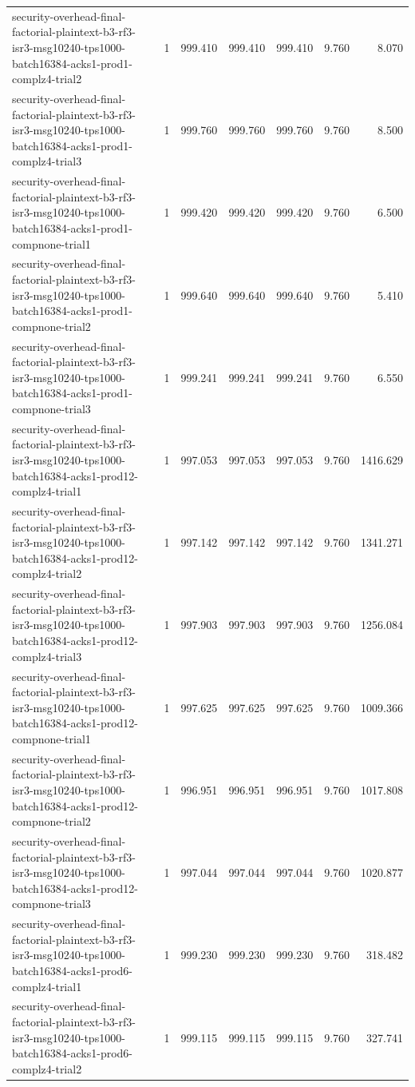 \begin{tabular}{lrrrrrr}
security-overhead-final-factorial-plaintext-b3-rf3-isr3-msg10240-tps1000-batch16384-acks1-prod1-complz4-trial2 & 1 & 999.410 & 999.410 & 999.410 & 9.760 & 8.070 \\
security-overhead-final-factorial-plaintext-b3-rf3-isr3-msg10240-tps1000-batch16384-acks1-prod1-complz4-trial3 & 1 & 999.760 & 999.760 & 999.760 & 9.760 & 8.500 \\
security-overhead-final-factorial-plaintext-b3-rf3-isr3-msg10240-tps1000-batch16384-acks1-prod1-compnone-trial1 & 1 & 999.420 & 999.420 & 999.420 & 9.760 & 6.500 \\
security-overhead-final-factorial-plaintext-b3-rf3-isr3-msg10240-tps1000-batch16384-acks1-prod1-compnone-trial2 & 1 & 999.640 & 999.640 & 999.640 & 9.760 & 5.410 \\
security-overhead-final-factorial-plaintext-b3-rf3-isr3-msg10240-tps1000-batch16384-acks1-prod1-compnone-trial3 & 1 & 999.241 & 999.241 & 999.241 & 9.760 & 6.550 \\
security-overhead-final-factorial-plaintext-b3-rf3-isr3-msg10240-tps1000-batch16384-acks1-prod12-complz4-trial1 & 1 & 997.053 & 997.053 & 997.053 & 9.760 & 1416.629 \\
security-overhead-final-factorial-plaintext-b3-rf3-isr3-msg10240-tps1000-batch16384-acks1-prod12-complz4-trial2 & 1 & 997.142 & 997.142 & 997.142 & 9.760 & 1341.271 \\
security-overhead-final-factorial-plaintext-b3-rf3-isr3-msg10240-tps1000-batch16384-acks1-prod12-complz4-trial3 & 1 & 997.903 & 997.903 & 997.903 & 9.760 & 1256.084 \\
security-overhead-final-factorial-plaintext-b3-rf3-isr3-msg10240-tps1000-batch16384-acks1-prod12-compnone-trial1 & 1 & 997.625 & 997.625 & 997.625 & 9.760 & 1009.366 \\
security-overhead-final-factorial-plaintext-b3-rf3-isr3-msg10240-tps1000-batch16384-acks1-prod12-compnone-trial2 & 1 & 996.951 & 996.951 & 996.951 & 9.760 & 1017.808 \\
security-overhead-final-factorial-plaintext-b3-rf3-isr3-msg10240-tps1000-batch16384-acks1-prod12-compnone-trial3 & 1 & 997.044 & 997.044 & 997.044 & 9.760 & 1020.877 \\
security-overhead-final-factorial-plaintext-b3-rf3-isr3-msg10240-tps1000-batch16384-acks1-prod6-complz4-trial1 & 1 & 999.230 & 999.230 & 999.230 & 9.760 & 318.482 \\
security-overhead-final-factorial-plaintext-b3-rf3-isr3-msg10240-tps1000-batch16384-acks1-prod6-complz4-trial2 & 1 & 999.115 & 999.115 & 999.115 & 9.760 & 327.741 \\

\end{tabular}
